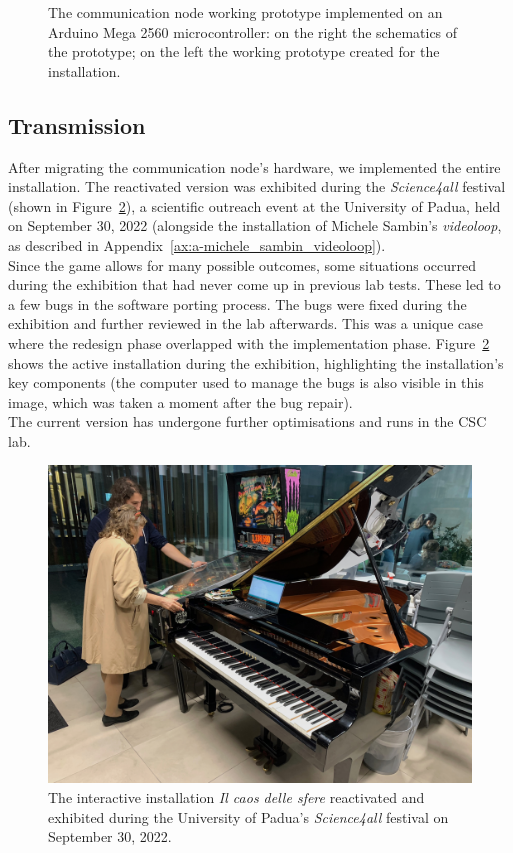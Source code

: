 \begin{figure}[h!]
\begin{minipage}[t]{0.35\textwidth}
    \end{minipage}
    \caption{The communication node working prototype implemented on an Arduino Mega 2560 microcontroller: on the right the schematics of the prototype; on the left the working prototype created for the installation.}
    \label{fig:ab-ilcaosdellesfere-arduino}
\end{figure}

\subsection*{Transmission}
After migrating the communication node's hardware, we implemented the entire installation. The reactivated version was exhibited during the \textit{Science4all} festival (shown in Figure~\ref{fig:ab-ilcaosdellesfere-exhibition}), a scientific outreach event at the University of Padua, held on September 30, 2022 (alongside the installation of Michele Sambin's \textit{videoloop}, as described in Appendix~\ref{ax:a-michele_sambin_videoloop}).\\
Since the game allows for many possible outcomes, some situations occurred during the exhibition that had never come up in previous lab tests. These led to a few bugs in the software porting process. The bugs were fixed during the exhibition and further reviewed in the lab afterwards. This was a unique case where the redesign phase overlapped with the implementation phase. Figure~\ref{fig:ab-ilcaosdellesfere-exhibition} shows the active installation during the exhibition, highlighting the installation's key components (the computer used to manage the bugs is also visible in this image, which was taken a moment after the bug repair).\\
The current version has undergone further optimisations and runs in the CSC lab.

\begin{figure}[!h]
    \centering
    \includegraphics[width=\linewidth]{chapters/appendix/b/image/figb-ilcaosdellesfere-exhibition.jpg}
    \caption{ The interactive installation \textit{Il caos delle sfere} reactivated and exhibited during the University of Padua’s \textit{Science4all} festival on September 30, 2022.}
    \label{fig:ab-ilcaosdellesfere-exhibition}
\end{figure}

